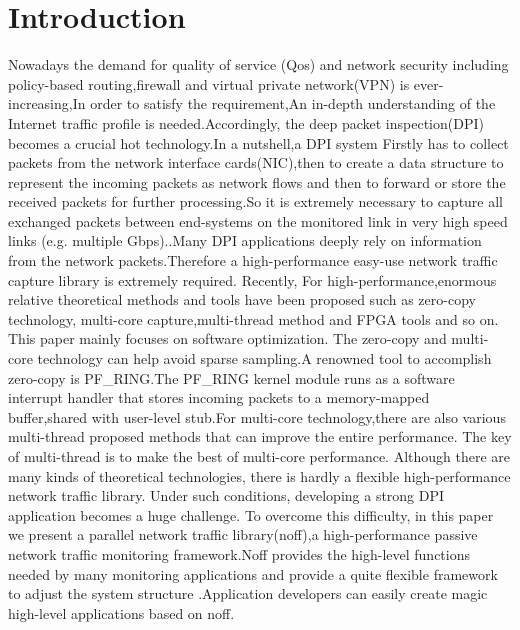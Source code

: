 \documentclass[conference]{IEEEtran}
\begin{document}
\section{Introduction}
Nowadays the demand for quality of service (Qos) and network security including policy-based routing,firewall and virtual private network(VPN) is ever-increasing\cite{Liu},In order to satisfy the requirement,An in-depth understanding of the Internet traffic profile is needed.Accordingly, the deep packet inspection(DPI) becomes a crucial hot technology\cite{Antonello}.In a nutshell,a DPI system Firstly has to collect packets from the network interface cards(NIC),then to create a data structure to represent the incoming packets as network flows and then to forward or store the received packets for further processing.So it is extremely necessary to capture all exchanged packets between end-systems on the monitored link in very high speed links (e.g. multiple Gbps).\cite{Antonello}.Many DPI applications deeply rely on information from the network packets.Therefore a high-performance easy-use network traffic capture library is extremely required.
\newline\indent Recently, For high-performance,enormous relative theoretical methods and tools have been proposed such as zero-copy technology, multi-core capture,multi-thread method and FPGA tools\cite{Qiao} and so on. This paper mainly focuses on software optimization.
The zero-copy and multi-core technology can help avoid sparse sampling\cite{Ali}.A renowned tool to accomplish zero-copy is PF\_RING\cite{PFRING}\cite{Luca}.The PF\_RING kernel module runs as a software interrupt handler that stores incoming packets to a memory-mapped buffer,shared with user-level stub.For multi-core technology,there are also various multi-thread proposed methods that can improve the entire performance.
The key of multi-thread is to make the best of multi-core performance.
\newline\indent Although there are many kinds of theoretical technologies, there is hardly a flexible high-performance network traffic library. Under such conditions, developing a strong DPI application becomes a huge challenge.
\newline\indent To overcome this difficulty, in this paper we present a parallel network traffic library(noff),a high-performance passive network traffic monitoring framework.Noff provides the high-level functions needed by many monitoring applications and provide a quite flexible framework to adjust the system structure .Application developers can easily create magic high-level applications based on noff.
\end{document}
